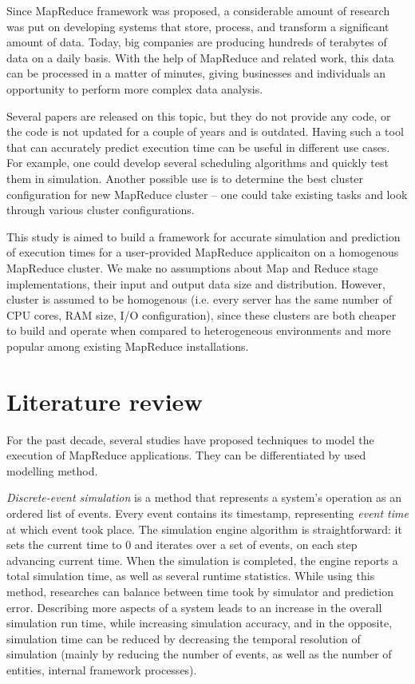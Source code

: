 \documentclass[conference]{IEEEtran} \IEEEoverridecommandlockouts
\begin{document}
    Since MapReduce framework was proposed, a
    considerable amount of research was put on developing systems that store,
    process, and transform a significant amount of data. Today, big companies
    are producing hundreds of terabytes of data on a daily basis. With the help
    of MapReduce and related work, this data can be processed in a matter of
    minutes, giving businesses and individuals an opportunity to perform more
    complex data analysis. 

    Several papers are released on this topic, but they do not provide any
    code, or the code is not updated for a couple of years and is outdated.
    Having such a tool that can accurately predict execution time can be useful
    in different use cases. For example, one could develop several scheduling
    algorithms and quickly test them in simulation. Another possible use is to
    determine the best cluster configuration for new MapReduce cluster -- one
    could take existing tasks and look through various cluster configurations.

    This study is aimed to build a framework for accurate simulation and
    prediction of execution times for a user-provided MapReduce applicaiton on
    a homogenous MapReduce cluster. We make no assumptions about Map and Reduce
    stage implementations, their input and output data size and distribution.
    However, cluster is assumed to be homogenous (i.e. every server has the
    same number of CPU cores, RAM size, I/O configuration), since these
    clusters are both cheaper to build and operate when compared to
    heterogeneous environments and more popular among existing MapReduce
    installations.

    \section{Literature review} 
    \label{literature_review} 

    For the past decade, several studies have proposed techniques to model the
    execution of MapReduce applications. They can be differentiated by used
    modelling method. 

    \textit{Discrete-event simulation} is a method that represents a system's
    operation as an ordered list of events. Every event contains its timestamp,
    representing \textit{event time} at which event took place. The simulation
    engine algorithm is straightforward: it sets the current time to 0 and
    iterates over a set of events, on each step advancing current time. When
    the simulation is completed, the engine reports a total simulation time, as
    well as several runtime statistics. While using this method, researches can
    balance between time took by simulator and prediction error. Describing
    more aspects of a system leads to an increase in the overall simulation run
    time, while increasing simulation accuracy, and in the opposite, simulation
    time can be reduced by decreasing the temporal resolution of simulation
    (mainly by reducing the number of events, as well as the number of
    entities, internal framework processes).
\end{document}
